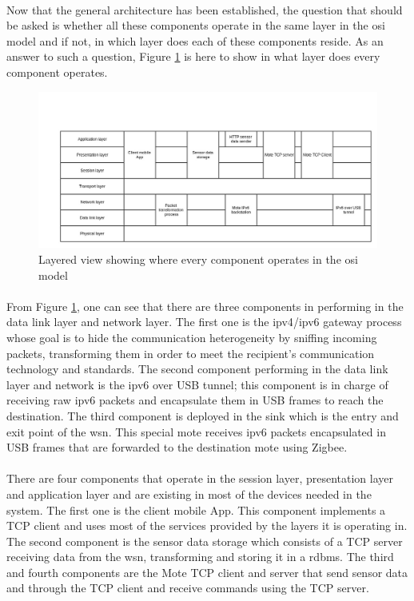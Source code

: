 \documentclass[12pt,a4paper,final]{report}
\begin{document}
\paragraph{}
Now that the general architecture has been established, the question that should be asked is whether all these components operate in the same layer in the \gls{osi} model and if not, in which layer does each of these components reside. As an answer to such a question, Figure \ref{fig:layered_view} is here to show in what layer does every component operates.

\begin{figure}[htbp]
\centering
\includegraphics[scale=0.40]{img/layered_view.jpg}
\caption{Layered view showing where every component operates in the \gls{osi} model}
\label{fig:layered_view}
\end{figure}

\paragraph{}
From Figure \ref{fig:layered_view}, one can see that there are three components in performing in the data link layer and network layer. The first one is the \gls{ipv4}/\gls{ipv6} gateway process whose goal is to hide the communication heterogeneity by sniffing incoming packets, transforming them in order to meet the recipient's communication technology and standards. The second component performing in the data link layer and network is the \gls{ipv6} over USB tunnel; this component is in charge of receiving raw \gls{ipv6} packets and encapsulate them in  USB frames to reach the destination. The third component is deployed in the sink which is the entry and exit point of the \gls{wsn}. This special mote receives \gls{ipv6} packets encapsulated in USB frames that are forwarded to the destination mote using Zigbee.

\paragraph{}
There are four components that operate in the session layer, presentation layer and application layer and are existing in most of the devices needed in the system. The first one is the client mobile App. This component implements a TCP client and uses most of the services provided by the layers it is operating in. The second component is the sensor data storage which consists of a TCP server receiving data from the \gls{wsn}, transforming and storing it in a \gls{rdbms}. The third and fourth components are the Mote TCP client and server that send sensor data and through the TCP client and receive commands using the TCP server. 
\end{document}
